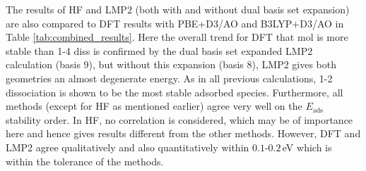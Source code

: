 \documentclass[11pt,DIV=13,BCOR=5mm,a4paper,headinclude]{scrbook}
\begin{document}
The results of HF and LMP2 (both with and without dual basis set expansion) are also compared to DFT results with PBE+D3/AO and B3LYP+D3/AO in Table \ref{tab:combined_results}.
Here the overall trend for DFT that mol is more stable than 1-4 diss is confirmed by the dual basis set expanded LMP2 calculation (basis 9), but without this expansion (basis 8), LMP2 gives both geometries an almost degenerate energy.
As in all previous calculations, 1-2 dissociation is shown to be the most stable  adsorbed species.
Furthermore, all methods (except for HF as mentioned earlier) agree very well on the $E_\textrm{ads}$ stability order.
In HF, no correlation is considered, which may be of importance here and hence gives results different from the other methods.
However, DFT and LMP2 agree qualitatively and also quantitatively within $0.1$-$0.2\,$eV which is within the tolerance of the methods.
\end{document}
